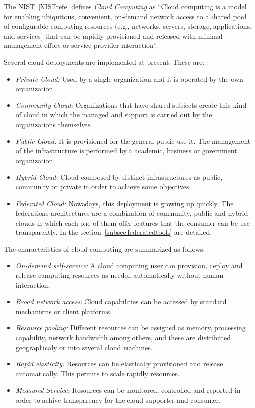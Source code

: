 The NIST~\ref{NISTrefe} defines \emph{Cloud Computing} as ``Cloud computing is a model for enabling ubiquitous, convenient, on-demand network access to a shared 
pool of configurable computing resources (e.g., networks, servers, storage, applications, and services) that 
can be rapidly provisioned and released with minimal management effort or
service provider interaction``.

Several cloud deployments are implemented at present. These are:
\begin{itemize}
\item \emph{Private Cloud:} Used by a single organization and it is operated by
  the own organization. 
\item \emph{Community Cloud:} Organizations that have shared subjects create
  this kind of cloud in which the managed and support is carried out by the
  organizations themselves.
\item \emph{Public Cloud:} It is provisioned for the general public use it. The
  management of the infrastructure is performed by a academic, business or
  government organization.
\item \emph{Hybrid Cloud:} Cloud composed by distinct infrastructures as public,
  community or private in order to achieve some objectives.
\item \emph{Federated Cloud:} Nowadays, this deployment is growing up
  quickly. The federations architectures are a combination of community, public
  and hybrid clouds in which each one of them offer features that the consumer can
  be use transparently. In the section~\ref{subsec:federatedtools} are detailed.
\end{itemize}

The characteristics of cloud computing are summarized as follows:
\begin{itemize}
\item \emph{On-demand self-service:} A cloud computing user can provision,
  deploy and release computing resources as needed automatically without human
  interaction.
\item \emph{Broad network access:} Cloud capabilities can be accessed by
  standard mechanisms or client platforms.
\item \emph{Resource pooling:} Different resources can be assigned as memory,
  processing capability, network bandwidth among others, and these are
  distributed geographicaly or into several cloud machines. 
\item \emph{Rapid elasticity:} Resources can be elastically provisioned and
  release automatically. This permits to scale rapidly resources.
\item \emph{Measured Service:} Resources can be monitored, controlled and
  reported in order to achive transparency for the cloud supporter and consumer.
\end{itemize}

